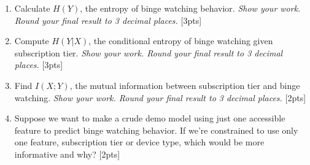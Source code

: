 \begin{enumerate}[label=\alph*.]
    \item Calculate $H(Y)$, the entropy of binge watching behavior. \emph{Show your work. Round your final result to 3 decimal places.} [3pts]

    \item Compute $H(Y|X)$, the conditional entropy of binge watching given subscription tier. \emph{Show your work. Round your final result to 3 decimal places.} [3pts]

    \item Find $I(X;Y)$, the mutual information between subscription tier and binge watching. \emph{Show your work. Round your final result to 3 decimal places.} [2pts]

    \item Suppose we want to make a crude demo model using just one accessible feature to predict binge watching behavior. If we're constrained to use only one feature, subscription tier or device type, which would be more informative and why? [2pts]
\end{enumerate}

